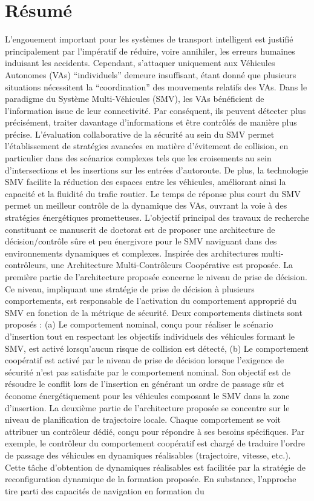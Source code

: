 
\chapter{Résumé}
        \vspace{-0.2cm}
\thispagestyle{empty}

L'engouement important pour  les systèmes de transport intelligent est justifié principalement par l'impératif de réduire, voire annihiler, les erreurs humaines induisant les accidents. Cependant, s'attaquer uniquement aux Véhicules Autonomes (VAs) ``individuels'' demeure insuffisant, étant donné que plusieurs situations nécessitent la ``coordination'' des mouvements relatifs des VAs. Dans le paradigme du Système Multi-Véhicules (SMV), les VAs bénéficient de l'information issue de leur connectivité. Par conséquent, ils peuvent détecter plus précisément, traiter davantage d'informations et être contrôlés de manière plus précise. L'évaluation collaborative de la sécurité au sein du SMV permet l'établissement de stratégies avancées en matière d'évitement de collision, en particulier dans des scénarios complexes tels que les croisements au sein d'intersections et les insertions sur les entrées d'autoroute. De plus, la technologie SMV facilite la réduction des espaces entre les véhicules, améliorant ainsi la capacité et la fluidité du trafic routier. Le temps de réponse plus court du SMV permet un meilleur contrôle de la dynamique des VAs, ouvrant la voie à des stratégies énergétiques prometteuses. L'objectif principal des travaux de recherche constituant ce manuscrit de doctorat est de proposer une architecture de décision/contrôle sûre et peu énergivore pour le SMV naviguant dans des environnements dynamiques et complexes. Inspirée des architectures multi-contrôleurs, une Architecture Multi-Contrôleurs Coopérative est proposée. La première partie de l'architecture proposée concerne le niveau de prise de décision. Ce niveau, impliquant une stratégie de prise de décision à plusieurs comportements, est responsable de l'activation du comportement approprié du SMV en fonction de la métrique de sécurité. Deux comportements distincts sont proposés : (a) Le comportement nominal, conçu pour réaliser le scénario d'insertion tout en respectant les objectifs individuels des véhicules formant le SMV, est activé lorsqu'aucun risque de collision est détecté, (b) Le comportement coopératif est activé par le niveau de prise de décision lorsque l'exigence de sécurité n'est pas satisfaite par le comportement nominal. Son objectif est de résoudre le conflit lors de l'insertion en générant un ordre de passage sûr et économe énergétiquement pour les véhicules composant le SMV dans la zone d'insertion. La deuxième partie de l'architecture proposée se concentre sur le niveau de planification de trajectoire locale. Chaque comportement se voit attribuer un contrôleur dédié, conçu pour répondre à ses besoins spécifiques. Par exemple, le contrôleur du comportement coopératif est chargé de traduire l'ordre de passage des véhicules en dynamiques réalisables (trajectoire, vitesse, etc.). Cette tâche d'obtention de dynamiques réalisables est facilitée par la stratégie de reconfiguration dynamique de la formation proposée. En substance, l'approche tire parti des capacités de navigation en formation du 